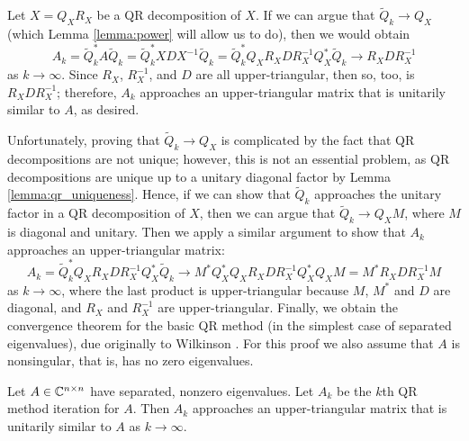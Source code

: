 \documentclass{article}
\newcommand{\Qt}{\widetilde{Q}}
\begin{document}
Let $X = Q_XR_X$ be a QR decomposition of $X$. If we can argue that $\Qt_k \to Q_X$ (which Lemma \ref{lemma:power} will allow us to do), then we would obtain
\begin{equation*}
	A_{k} = \Qt_k^*A\Qt_k = \Qt_k^*XDX^{-1}\Qt_k = \Qt_k^*Q_XR_XDR_X^{-1}Q_X^*\Qt_k \to R_XDR_X^{-1}
\end{equation*}
as $k \to \infty$. Since $R_X$, $R_X^{-1}$, and $D$ are all upper-triangular, then so, too, is $R_XDR_X^{-1}$; therefore, $A_k$ approaches an upper-triangular matrix that is unitarily similar to $A$, as desired.

Unfortunately, proving that $\Qt_k \to Q_X$ is complicated by the fact that QR decompositions are not unique; however, this is not an essential problem, as QR decompositions are unique up to a unitary diagonal factor by Lemma \ref{lemma:qr_uniqueness}. Hence, if we can show that $\Qt_k$ approaches the unitary factor in a QR decomposition of $X$, then we can argue that $\Qt_k \to Q_XM$, where $M$ is diagonal and unitary. Then we apply a similar argument to show that $A_k$ approaches an upper-triangular matrix:
\begin{equation*}
	A_k = \Qt_k^*Q_XR_XDR_X^{-1}Q_X^*\Qt_k \to M^*Q_X^*Q_XR_XDR_X^{-1}Q_X^*Q_XM = M^*R_XDR_X^{-1}M
\end{equation*}
as $k \to \infty$, where the last product is upper-triangular because $M$, $M^*$ and $D$ are diagonal, and $R_X$ and $R_X^{-1}$ are upper-triangular. Finally, we obtain the convergence theorem for the basic QR method (in the simplest case of separated eigenvalues), due originally to Wilkinson \cite{wilkinson_1965}. For this proof we also assume that $A$ is nonsingular, that is, has no zero eigenvalues.
\begin{theorem}
	\label{thm:basic_method}
	Let $A \in \mathbb{C}^{n\times n}$ have separated, nonzero eigenvalues. Let $A_k$ be the $k$th QR method iteration for $A$. Then $A_k$ approaches an upper-triangular matrix that is unitarily similar to $A$ as $k\to\infty$.
\end{theorem}
\end{document}
